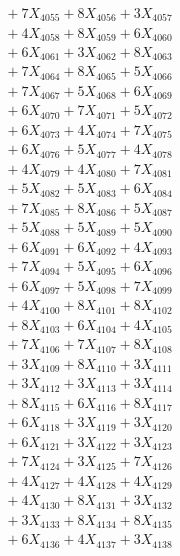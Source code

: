 \documentclass[a4paper,10pt]{article}
\begin{document}
{\begin{align}
&\;  + 7 X_{4055} + 8 X_{4056} + 3 X_{4057} \\[0.3ex]
&\;  + 4 X_{4058} + 8 X_{4059} + 6 X_{4060} \\[0.5ex]\allowbreak
&\;  + 6 X_{4061} + 3 X_{4062} + 8 X_{4063} \\[0.3ex]
&\;  + 7 X_{4064} + 8 X_{4065} + 5 X_{4066} \\[0.3ex]
&\;  + 7 X_{4067} + 5 X_{4068} + 6 X_{4069} \\[0.3ex]
&\;  + 6 X_{4070} + 7 X_{4071} + 5 X_{4072} \\[0.3ex]
&\;  + 6 X_{4073} + 4 X_{4074} + 7 X_{4075} \\[0.3ex]
&\;  + 6 X_{4076} + 5 X_{4077} + 4 X_{4078} \\[0.3ex]
&\;  + 4 X_{4079} + 4 X_{4080} + 7 X_{4081} \\[0.3ex]
&\;  + 5 X_{4082} + 5 X_{4083} + 6 X_{4084} \\[0.3ex]
&\;  + 7 X_{4085} + 8 X_{4086} + 5 X_{4087} \\[0.3ex]
&\;  + 5 X_{4088} + 5 X_{4089} + 5 X_{4090} \\[0.5ex]\allowbreak
&\;  + 6 X_{4091} + 6 X_{4092} + 4 X_{4093} \\[0.3ex]
&\;  + 7 X_{4094} + 5 X_{4095} + 6 X_{4096} \\[0.3ex]
&\;  + 6 X_{4097} + 5 X_{4098} + 7 X_{4099} \\[0.3ex]
&\;  + 4 X_{4100} + 8 X_{4101} + 8 X_{4102} \\[0.3ex]
&\;  + 8 X_{4103} + 6 X_{4104} + 4 X_{4105} \\[0.3ex]
&\;  + 7 X_{4106} + 7 X_{4107} + 8 X_{4108} \\[0.3ex]
&\;  + 3 X_{4109} + 8 X_{4110} + 3 X_{4111} \\[0.3ex]
&\;  + 3 X_{4112} + 3 X_{4113} + 3 X_{4114} \\[0.3ex]
&\;  + 8 X_{4115} + 6 X_{4116} + 8 X_{4117} \\[0.3ex]
&\;  + 6 X_{4118} + 3 X_{4119} + 3 X_{4120} \\[0.5ex]\allowbreak
&\;  + 6 X_{4121} + 3 X_{4122} + 3 X_{4123} \\[0.3ex]
&\;  + 7 X_{4124} + 3 X_{4125} + 7 X_{4126} \\[0.3ex]
&\;  + 4 X_{4127} + 4 X_{4128} + 4 X_{4129} \\[0.3ex]
&\;  + 4 X_{4130} + 8 X_{4131} + 3 X_{4132} \\[0.3ex]
&\;  + 3 X_{4133} + 8 X_{4134} + 8 X_{4135} \\[0.3ex]
&\;  + 6 X_{4136} + 4 X_{4137} + 3 X_{4138} \\[0.3ex]

\end{align}}
\end{document}
